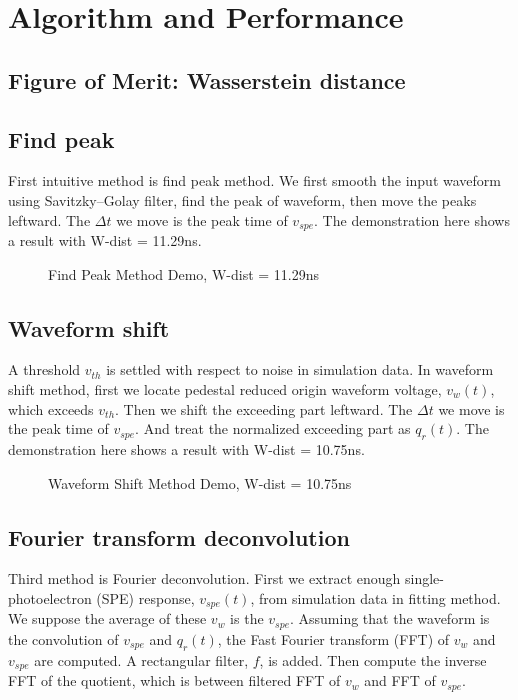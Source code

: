 \section{Algorithm and Performance} %
\label{sec:algorithm}

\subsection{Figure of Merit: Wasserstein distance}


\subsection{Find peak}
First intuitive method is find peak method. We first smooth the input waveform using Savitzky–Golay filter, find the peak of waveform, then move the peaks leftward. The $\Delta t$ we move is the peak time of $v_{spe}$. The demonstration here shows a result with W-dist = 11.29ns. 

\begin{figure}[H]
    \centering
    \scalebox{0.4}{}
    \caption{Find Peak Method Demo, W-dist = 11.29ns}
\end{figure}

\subsection{Waveform shift}
A threshold $v_{th}$ is settled with respect to noise in simulation data. In waveform shift method, first we locate pedestal reduced origin waveform voltage, $v_{w}(t)$, which exceeds $v_{th}$. Then we shift the exceeding part leftward. The $\Delta t$ we move is the peak time of $v_{spe}$. And treat the normalized exceeding part as $q_{r}(t)$. The demonstration here shows a result with W-dist = 10.75ns. 

\begin{figure}[H]
    \centering
    \scalebox{0.4}{}
    \caption{Waveform Shift Method Demo, W-dist = 10.75ns}
\end{figure}

\subsection{Fourier transform deconvolution}
Third method is Fourier deconvolution. First we extract enough single-photoelectron (SPE) response, $v_{spe}(t)$, from simulation data in fitting method. We suppose the average of these $v_{w}$ is the $v_{spe}$. Assuming that the waveform is the convolution of $v_{spe}$ and $q_{r}(t)$, the Fast Fourier transform (FFT) of $v_{w}$ and $v_{spe}$ are computed. A rectangular filter, $f$, is added. Then compute the inverse FFT of the quotient, which is between filtered FFT of $v_{w}$ and FFT of $v_{spe}$. 

